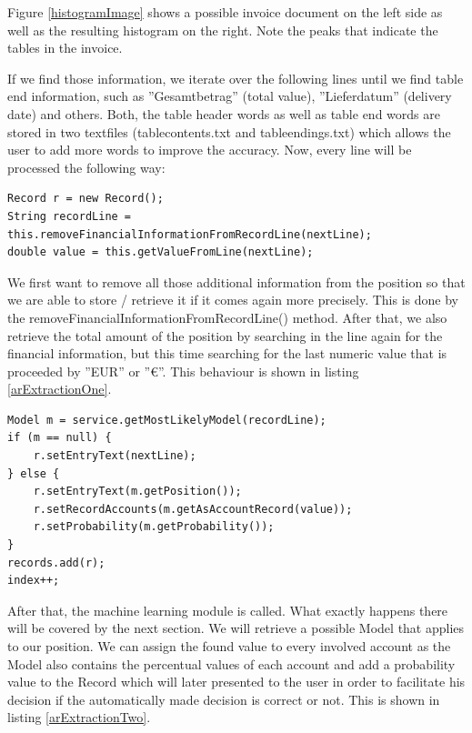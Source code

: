 Figure \ref{histogramImage} shows a possible invoice document on the left side as well as the resulting histogram on the right. Note the peaks that indicate the tables in the invoice.

If we find those information, we iterate over the following lines until we find table end information, such as ''Gesamtbetrag'' (total value), ''Lieferdatum'' (delivery date) and others. Both, the table header words as well as table end words are stored in two textfiles (tablecontents.txt and tableendings.txt) which allows the user to add more words to improve the accuracy.
Now, every line will be processed the following way:

\begin{lstlisting}[caption={Manipulating and retrieving information from a position},label={arExtractionOne}]
Record r = new Record();
String recordLine = this.removeFinancialInformationFromRecordLine(nextLine);
double value = this.getValueFromLine(nextLine);
\end{lstlisting}

We first want to remove all those additional information from the position so that we are able to store / retrieve it if it comes again more precisely. This is done by the removeFinancialInformationFromRecordLine() method. After that, we also retrieve the total amount of the position by searching in the line again for the financial information, but this time searching for the last numeric value that is proceeded by ''EUR'' or ''\euro''. This behaviour is shown in listing \ref{arExtractionOne}.

\begin{lstlisting}[caption={Finding a model for the position},label={arExtractionTwo}]
Model m = service.getMostLikelyModel(recordLine); 
if (m == null) {
    r.setEntryText(nextLine);
} else {
    r.setEntryText(m.getPosition());
    r.setRecordAccounts(m.getAsAccountRecord(value));
    r.setProbability(m.getProbability());
}
records.add(r);
index++;
\end{lstlisting}

After that, the machine learning module is called. What exactly happens there will be covered by the next section. We will retrieve a possible Model that applies to our position. We can assign the found value to every involved account as the Model also contains the percentual values of each account and add a probability value to the Record which will later presented to the user in order to facilitate his decision if the automatically made decision is correct or not. This is shown in listing \ref{arExtractionTwo}.


